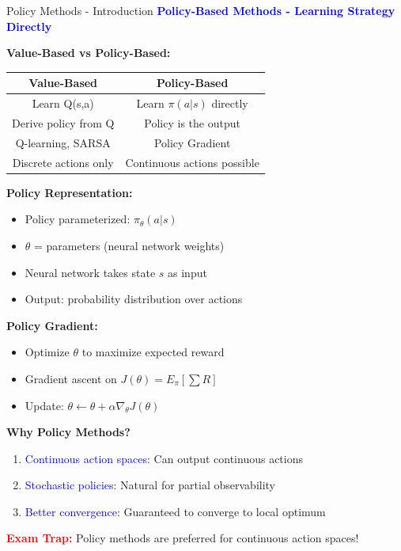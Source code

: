 \documentclass[8pt]{beamer}
\begin{document}

\begin{frame}{Policy Methods - Introduction}
\fontsize{6.5}{7.5}\selectfont
\textcolor{blue}{\textbf{Policy-Based Methods - Learning Strategy Directly}}

\textbf{Value-Based vs Policy-Based:}
\begin{tabular}{|c|c|}
\hline
Value-Based & Policy-Based \\
\hline
Learn Q(s,a) & Learn $\pi(a|s)$ directly \\
\hline
Derive policy from Q & Policy is the output \\
\hline
Q-learning, SARSA & Policy Gradient \\
\hline
Discrete actions only & Continuous actions possible \\
\hline
\end{tabular}

\textbf{Policy Representation:}
\begin{itemize}
\item Policy parameterized: $\pi_\theta(a|s)$
\item $\theta$ = parameters (neural network weights)
\item Neural network takes state $s$ as input
\item Output: probability distribution over actions
\end{itemize}

\textbf{Policy Gradient:}
\begin{itemize}
\item Optimize $\theta$ to maximize expected reward
\item Gradient ascent on $J(\theta) = E_\pi[\sum R]$
\item Update: $\theta \leftarrow \theta + \alpha \nabla_\theta J(\theta)$
\end{itemize}

\textbf{Why Policy Methods?}
\begin{enumerate}
\item \textcolor{blue}{Continuous action spaces}: Can output continuous actions
\item \textcolor{blue}{Stochastic policies}: Natural for partial observability
\item \textcolor{blue}{Better convergence}: Guaranteed to converge to local optimum
\end{enumerate}

\textcolor{red}{\textbf{Exam Trap:}} Policy methods are preferred for continuous action spaces!
\end{frame}
\end{document}
